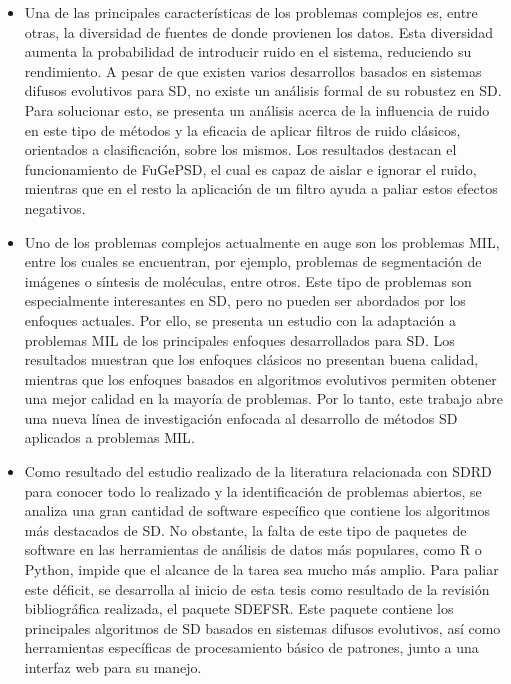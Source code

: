 \documentclass[c5paper,10pt,twoside]{book}	   	%
\begin{document}
\begin{itemize}

	
	\item Una de las principales características de los problemas complejos es, entre otras, la diversidad de fuentes de donde provienen los datos. Esta diversidad aumenta la probabilidad de introducir ruido en el sistema, reduciendo su rendimiento. A pesar de que existen varios desarrollos basados en sistemas difusos evolutivos para \ac{SD}, no existe un análisis formal de su robustez en \ac{SD}. Para solucionar esto, se presenta un análisis acerca de la influencia de ruido en este tipo de métodos y la eficacia de aplicar filtros de ruido clásicos, orientados a clasificación, sobre los mismos. Los resultados destacan el funcionamiento de FuGePSD, el cual es capaz de aislar e ignorar el ruido, mientras que en el resto la aplicación de un filtro ayuda a paliar estos efectos negativos. 

	\item Uno de los problemas complejos actualmente en auge son los problemas \ac{MIL}, entre los cuales se encuentran, por ejemplo, problemas de segmentación de imágenes o síntesis de moléculas, entre otros. Este tipo de problemas son especialmente interesantes en \ac{SD}, pero no pueden ser abordados por los enfoques actuales. Por ello, se presenta un estudio con la adaptación a problemas \ac{MIL} de los principales enfoques desarrollados para \ac{SD}. Los resultados muestran que los enfoques clásicos no presentan buena calidad, mientras que los enfoques basados en algoritmos evolutivos permiten obtener una mejor calidad en la mayoría de problemas. Por lo tanto, este trabajo abre una nueva línea de investigación enfocada al desarrollo de métodos \ac{SD} aplicados a problemas \ac{MIL}.
	
	\item Como resultado del estudio realizado de la literatura relacionada con \ac{SDRD} para conocer todo lo realizado y la identificación de problemas abiertos, se analiza una gran cantidad de software específico que contiene los algoritmos más destacados de \ac{SD}. No obstante, la falta de este tipo de paquetes de software en las herramientas de análisis de datos más populares, como R o Python, impide que el alcance de la tarea sea mucho más amplio. Para paliar este déficit, se desarrolla al inicio de esta tesis como resultado de la revisión bibliográfica realizada, el paquete SDEFSR. Este paquete contiene los principales algoritmos de \ac{SD} basados en sistemas difusos evolutivos, así como herramientas específicas de procesamiento básico de patrones, junto a una interfaz web para su manejo. \end{itemize}
\end{document}
